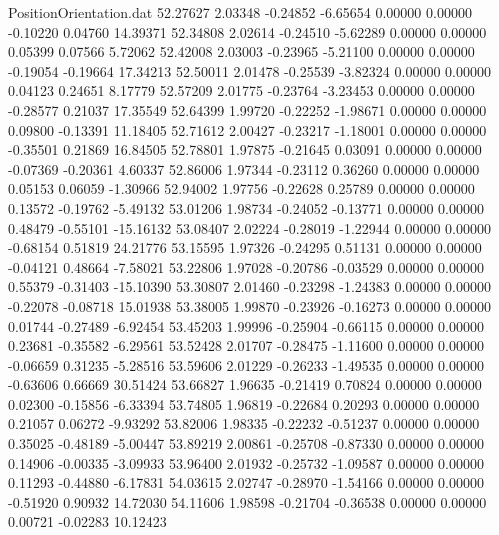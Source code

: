 \begin{filecontents}{PositionOrientation.dat}
  52.27627    2.03348   -0.24852    -6.65654    0.00000    0.00000   -0.10220    0.04760   14.39371
  52.34808    2.02614   -0.24510    -5.62289    0.00000    0.00000    0.05399    0.07566    5.72062
  52.42008    2.03003   -0.23965    -5.21100    0.00000    0.00000   -0.19054   -0.19664   17.34213
  52.50011    2.01478   -0.25539    -3.82324    0.00000    0.00000    0.04123    0.24651    8.17779
  52.57209    2.01775   -0.23764    -3.23453    0.00000    0.00000   -0.28577    0.21037   17.35549
  52.64399    1.99720   -0.22252    -1.98671    0.00000    0.00000    0.09800   -0.13391   11.18405
  52.71612    2.00427   -0.23217    -1.18001    0.00000    0.00000   -0.35501    0.21869   16.84505
  52.78801    1.97875   -0.21645     0.03091    0.00000    0.00000   -0.07369   -0.20361    4.60337
  52.86006    1.97344   -0.23112     0.36260    0.00000    0.00000    0.05153    0.06059   -1.30966
  52.94002    1.97756   -0.22628     0.25789    0.00000    0.00000    0.13572   -0.19762   -5.49132
  53.01206    1.98734   -0.24052    -0.13771    0.00000    0.00000    0.48479   -0.55101  -15.16132
  53.08407    2.02224   -0.28019    -1.22944    0.00000    0.00000   -0.68154    0.51819   24.21776
  53.15595    1.97326   -0.24295     0.51131    0.00000    0.00000   -0.04121    0.48664   -7.58021
  53.22806    1.97028   -0.20786    -0.03529    0.00000    0.00000    0.55379   -0.31403  -15.10390
  53.30807    2.01460   -0.23298    -1.24383    0.00000    0.00000   -0.22078   -0.08718   15.01938
  53.38005    1.99870   -0.23926    -0.16273    0.00000    0.00000    0.01744   -0.27489   -6.92454
  53.45203    1.99996   -0.25904    -0.66115    0.00000    0.00000    0.23681   -0.35582   -6.29561
  53.52428    2.01707   -0.28475    -1.11600    0.00000    0.00000   -0.06659    0.31235   -5.28516
  53.59606    2.01229   -0.26233    -1.49535    0.00000    0.00000   -0.63606    0.66669   30.51424
  53.66827    1.96635   -0.21419     0.70824    0.00000    0.00000    0.02300   -0.15856   -6.33394
  53.74805    1.96819   -0.22684     0.20293    0.00000    0.00000    0.21057    0.06272   -9.93292
  53.82006    1.98335   -0.22232    -0.51237    0.00000    0.00000    0.35025   -0.48189   -5.00447
  53.89219    2.00861   -0.25708    -0.87330    0.00000    0.00000    0.14906   -0.00335   -3.09933
  53.96400    2.01932   -0.25732    -1.09587    0.00000    0.00000    0.11293   -0.44880   -6.17831
  54.03615    2.02747   -0.28970    -1.54166    0.00000    0.00000   -0.51920    0.90932   14.72030
  54.11606    1.98598   -0.21704    -0.36538    0.00000    0.00000    0.00721   -0.02283   10.12423

\end{filecontents}
